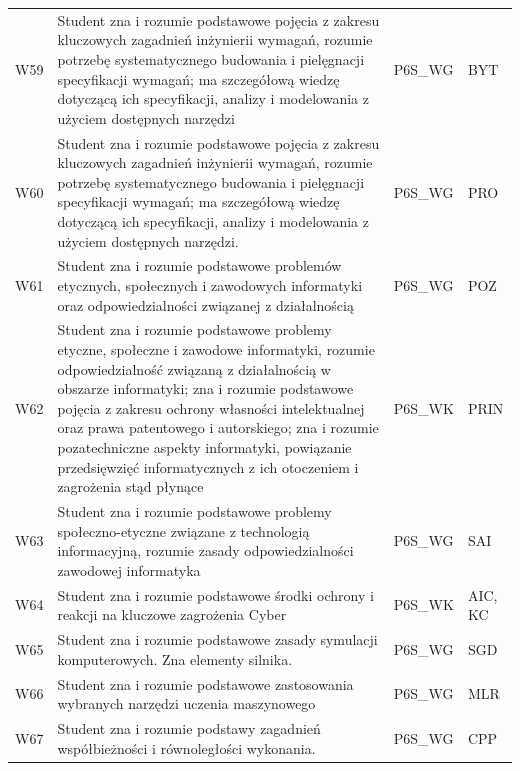 \documentclass[12pt,a4paper]{article}
\begin{document}
{\begin{longtable}{m{1cm}m{8.8cm}m{2.1cm}m{2.5cm}}
\rowcolor{tableRowLight} W59 & Student zna i rozumie podstawowe pojęcia z zakresu kluczowych zagadnień inżynierii wymagań, rozumie potrzebę systematycznego budowania i pielęgnacji specyfikacji wymagań; ma szczegółową wiedzę dotyczącą ich specyfikacji, analizy i modelowania z użyciem dostępnych narzędzi & {\scriptsize P6S\_WG} & {\scriptsize BYT} \\
\rowcolor{tableRowAlt} W60 & Student zna i rozumie podstawowe pojęcia z zakresu kluczowych zagadnień inżynierii wymagań, rozumie potrzebę systematycznego budowania i pielęgnacji specyfikacji wymagań; ma szczegółową wiedzę dotyczącą ich specyfikacji, analizy i modelowania z użyciem dostępnych narzędzi. & {\scriptsize P6S\_WG} & {\scriptsize PRO} \\
\rowcolor{tableRowLight} W61 & Student zna i rozumie podstawowe problemów etycznych, społecznych i zawodowych informatyki oraz odpowiedzialności związanej z działalnością & {\scriptsize P6S\_WG} & {\scriptsize POZ} \\
\rowcolor{tableRowAlt} W62 & Student zna i rozumie podstawowe problemy etyczne, społeczne i zawodowe informatyki, rozumie odpowiedzialność związaną z działalnością w obszarze informatyki; zna i rozumie podstawowe pojęcia z zakresu ochrony własności intelektualnej oraz prawa patentowego i autorskiego; zna i rozumie pozatechniczne aspekty informatyki, powiązanie przedsięwzięć informatycznych z ich otoczeniem i zagrożenia stąd płynące & {\scriptsize P6S\_WK} & {\scriptsize PRIN} \\
\rowcolor{tableRowLight} W63 & Student zna i rozumie podstawowe problemy społeczno-etyczne związane z technologią informacyjną, rozumie zasady odpowiedzialności zawodowej informatyka & {\scriptsize P6S\_WG} & {\scriptsize SAI} \\
\rowcolor{tableRowAlt} W64 & Student zna i rozumie podstawowe środki ochrony i reakcji na kluczowe zagrożenia Cyber & {\scriptsize P6S\_WK} & {\scriptsize AIC, KC} \\
\rowcolor{tableRowLight} W65 & Student zna i rozumie podstawowe zasady symulacji komputerowych. Zna elementy silnika. & {\scriptsize P6S\_WG} & {\scriptsize SGD} \\
\rowcolor{tableRowAlt} W66 & Student zna i rozumie podstawowe zastosowania wybranych narzędzi uczenia maszynowego & {\scriptsize P6S\_WG} & {\scriptsize MLR} \\
\rowcolor{tableRowLight} W67 & Student zna i rozumie podstawy zagadnień współbieżności i równoległości wykonania. & {\scriptsize P6S\_WG} & {\scriptsize CPP} \\

\end{longtable}}
\end{document}
